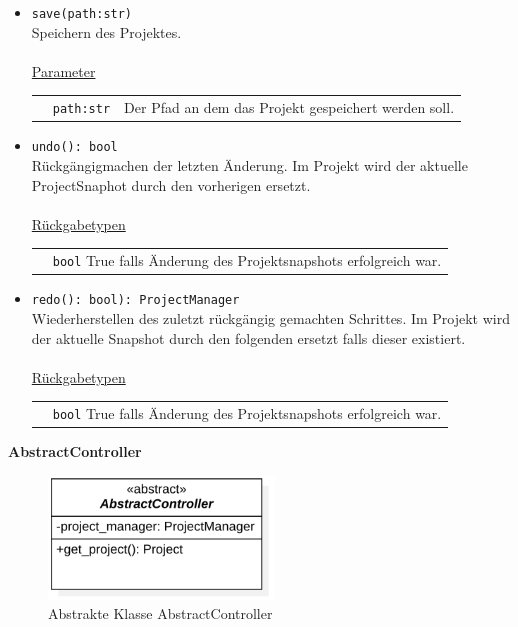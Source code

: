 \documentclass{article}
\begin{document}
\begin{itemize}
\item \texttt{save(path:str)}\\ Speichern des Projektes.\\\\
\underline{{Parameter}}\\
\begin{tabular}{lll}
 & \texttt{path:str} & Der Pfad an dem das Projekt gespeichert werden soll. \\
\end{tabular}
\item \texttt{undo(): bool}\\ Rückgängigmachen der letzten Änderung. Im Projekt wird der aktuelle ProjectSnaphot durch den vorherigen ersetzt.\\\\
\underline{{Rückgabetypen}}\\
\begin{tabular}{lp{10.7cm}}
 & \texttt{bool}  True falls Änderung des Projektsnapshots erfolgreich war.\\
\end{tabular}
\item \texttt{redo(): bool): ProjectManager}\\ Wiederherstellen des zuletzt rückgängig gemachten Schrittes. Im Projekt wird der aktuelle Snapshot durch den folgenden ersetzt falls dieser existiert.\\\\
\underline{{Rückgabetypen}}\\
\begin{tabular}{lp{10.7cm}}
 & \texttt{bool}  True falls Änderung des Projektsnapshots erfolgreich war.\\
\end{tabular}
\end{itemize}


\newpage
\textbf{\large{AbstractController}}\label{cls:AbstractController}
\begin{figure}[H]%
    \centering
    \includegraphics[width=6cm]{entwurf/Floriane/AbstractController.png}
    \caption{Abstrakte Klasse AbstractController}
\end{figure}
\end{document}
